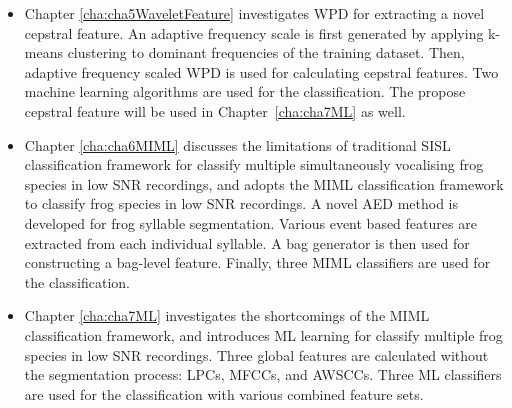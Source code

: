 \begin{itemize}
\item  Chapter \ref{cha:cha5WaveletFeature} investigates WPD for extracting a novel cepstral feature. An adaptive frequency scale is first generated by applying k-means clustering to dominant frequencies of the training dataset.
Then, adaptive frequency scaled WPD is used for calculating cepstral features. Two machine learning algorithms are used for the classification. The propose cepstral feature will be used in Chapter~\ref{cha:cha7ML} as well.




\item  Chapter \ref{cha:cha6MIML} discusses the limitations of traditional SISL classification framework for classify multiple simultaneously vocalising frog species in low SNR recordings, and adopts the MIML classification framework to classify frog species in low SNR recordings. A novel AED method is developed for frog syllable segmentation. Various event based features are extracted from each individual syllable. A bag generator is then used for constructing a bag-level feature. Finally, three MIML classifiers are used for the classification.

 


\item  Chapter \ref{cha:cha7ML} investigates the shortcomings of the MIML classification framework, and introduces ML learning for classify multiple frog species in low SNR recordings. Three global features are calculated without the segmentation process: LPCs, MFCCs, and AWSCCs. Three ML classifiers are used for the classification with various combined feature sets.






\end{itemize}
